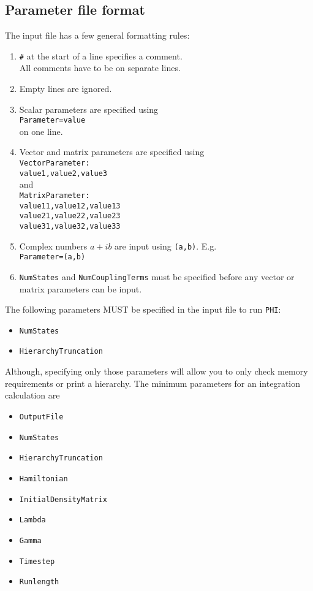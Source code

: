 \documentclass[11pt]{article}
\newcommand{\PHI}{\texttt{PHI}}
\begin{document}
\subsection{Parameter file format}
The input file has a few general formatting rules:
\begin{enumerate}
\item \texttt{\#} at the start of a line specifies a comment.\\All comments have to be on separate lines.\\
\item Empty lines are ignored.\\
\item Scalar parameters are specified using\\
\texttt{Parameter=value}\\on one line.\\
\item Vector and matrix parameters are specified using\\
\texttt{VectorParameter:}\\
\texttt{value1,value2,value3}\\
and\\
\texttt{MatrixParameter:}\\
\texttt{value11,value12,value13}\\
\texttt{value21,value22,value23}\\
\texttt{value31,value32,value33}\\
\item Complex numbers $a+ib$ are input using \texttt{(a,b)}. E.g.\\\texttt{Parameter=(a,b)}\\
\item \texttt{NumStates} and \texttt{NumCouplingTerms} must be specified before any vector or matrix parameters can be input.\\
\end{enumerate}
The following parameters MUST be specified in the input file to run \PHI:
\begin{itemize}
\item \texttt{NumStates}
\item \texttt{HierarchyTruncation}
\end{itemize}
Although, specifying only those parameters will allow you to only check memory requirements or print a hierarchy. The minimum parameters for an integration calculation are
\begin{itemize}
\item \texttt{OutputFile}
\item \texttt{NumStates}
\item \texttt{HierarchyTruncation}
\item \texttt{Hamiltonian}
\item \texttt{InitialDensityMatrix}
\item \texttt{Lambda}
\item \texttt{Gamma}
\item \texttt{Timestep}
\item \texttt{Runlength}
\end{itemize}
\end{document}
